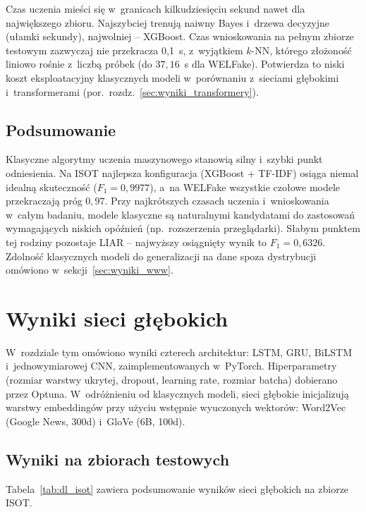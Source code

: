 \documentclass[oneside,polski,logo]{amuthesis}
\begin{document}
Czas uczenia mieści się w~granicach kilkudziesięciu sekund nawet dla
największego zbioru. Najszybciej trenują naiwny Bayes i~drzewa decyzyjne
(ułamki sekundy), najwolniej -- XGBoost. Czas wnioskowania na pełnym
zbiorze testowym zazwyczaj nie przekracza 0{,}1~s, z~wyjątkiem $k$-NN,
którego złożoność liniowo rośnie z~liczbą próbek (do \(37{,}16\)~s dla
WELFake). Potwierdza to niski koszt eksploatacyjny klasycznych modeli
w~porównaniu z~sieciami głębokimi i~transformerami
(por.\ rozdz.~\ref{sec:wyniki_transformery}).

\subsection{Podsumowanie}
\label{sec:wyniki_klasyczne_podsum}

Klasyczne algorytmy uczenia maszynowego stanowią silny i~szybki punkt
odniesienia. Na ISOT najlepsza konfiguracja (XGBoost + TF-IDF)
osiąga niemal idealną skuteczność (\(F_1 = 0{,}9977\)), a~na WELFake
wszystkie czołowe modele przekraczają próg \(0{,}97\). Przy najkrótszych
czasach uczenia i~wnioskowania w~całym badaniu, modele klasyczne
są naturalnymi kandydatami do zastosowań wymagających niskich opóźnień
(np.\ rozszerzenia przeglądarki). Słabym punktem tej rodziny pozostaje
LIAR -- najwyższy osiągnięty wynik to \(F_1 = 0{,}6326\). Zdolność
klasycznych modeli do generalizacji na dane spoza dystrybucji
omówiono w~sekcji~\ref{sec:wyniki_www}.

\section{Wyniki sieci głębokich}
\label{sec:wyniki_glebokie}

W~rozdziale tym omówiono wyniki czterech architektur: LSTM, GRU,
BiLSTM i~jednowymiarowej CNN, zaimplementowanych w~PyTorch.
Hiperparametry (rozmiar warstwy ukrytej, dropout, learning rate,
rozmiar batcha) dobierano przez Optuna. W~odróżnieniu od klasycznych
modeli, sieci głębokie inicjalizują warstwy embeddingów przy użyciu
wstępnie wyuczonych wektorów: Word2Vec (Google News, 300d)
i~GloVe (6B, 100d).

\subsection{Wyniki na zbiorach testowych}
\label{sec:wyniki_glebokie_test}

Tabela~\ref{tab:dl_isot} zawiera podsumowanie wyników sieci głębokich
na zbiorze ISOT.
\end{document}

